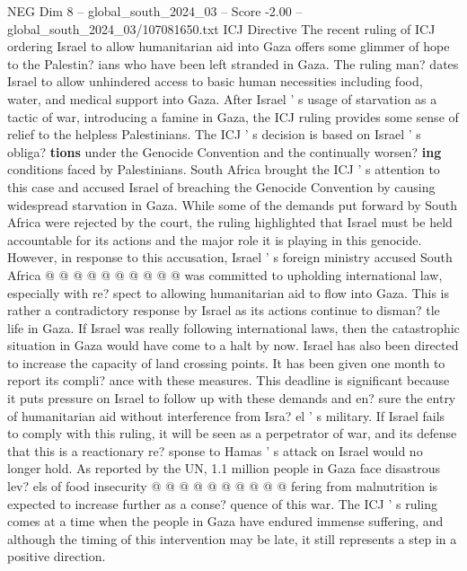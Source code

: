 \begin{textsample}{NEG Dim 8 – global\_south\_2024\_03 – Score -2.00 – global\_south\_2024\_03/107081650.txt}  \label{ex:f8_neg_020}
ICJ Directive The recent ruling of ICJ ordering Israel to allow humanitarian aid into Gaza offers some glimmer of hope to the Palestin? ians who have been left stranded in Gaza.
The ruling man? dates Israel to allow unhindered access to basic human necessities including food, water, and medical support into Gaza.
After Israel ' s usage of starvation as a tactic of war, introducing a famine in Gaza, the ICJ ruling provides some sense of relief to the helpless Palestinians.
The ICJ ' s decision is based on Israel ' s obliga? \textbf{tions} under the Genocide Convention and the continually worsen? \textbf{ing} conditions faced by Palestinians.
South Africa brought the ICJ ' s attention to this case and accused Israel of breaching the Genocide Convention by causing widespread starvation in Gaza.
While some of the demands put forward by South Africa were rejected by the court, the ruling highlighted that Israel must be held accountable for its actions and the major role it is playing in this genocide.
However, in response to this accusation, Israel ' s foreign ministry accused South Africa @ @ @ @ @ @ @ @ @ @ was committed to upholding international law, especially with re? spect to allowing humanitarian aid to flow into Gaza.
This is rather a contradictory response by Israel as its actions continue to disman? tle life in Gaza.
If Israel was really following international laws, then the catastrophic situation in Gaza would have come to a halt by now.
Israel has also been directed to increase the capacity of land crossing points.
It has been given one month to report its compli? ance with these measures.
This deadline is significant because it puts pressure on Israel to follow up with these demands and en? sure the entry of humanitarian aid without interference from Isra? el ' s military.
If Israel fails to comply with this ruling, it will be seen as a perpetrator of war, and its defense that this is a reactionary re? sponse to Hamas ' s attack on Israel would no longer hold.
As reported by the UN, 1.1 million people in Gaza face disastrous lev? els of food insecurity @ @ @ @ @ @ @ @ @ @ fering from malnutrition is expected to increase further as a conse? quence of this war.
The ICJ ' s ruling comes at a time when the people in Gaza have endured immense suffering, and although the timing of this intervention may be late, it still represents a step in a positive direction.

\end{textsample}
